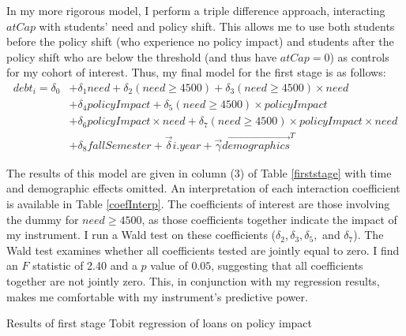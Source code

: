 \documentclass[12pt]{article}
\newcommand{\regs}{../Analysis/Regressions/Output/}
\begin{document}
	In my more rigorous model, I perform a triple difference approach, interacting $atCap$ with students' need and policy shift. This allows me to use both students before the policy shift (who experience no policy impact) and students after the policy shift who are below the threshold (and thus have $atCap = 0$) as controls for my cohort of interest. Thus, my final model for the first stage is as follows: 
	\begin{equation}
	\begin{aligned}
	debt_i = \delta_0 &+ \delta_1 need + \delta_2 (need \geq 4500) + \delta_3 (need \geq 4500) \times need \\ 
	&+ \delta_4 policyImpact + \delta_5 (need \geq 4500) \times policyImpact \\
	&+ \delta_6 policyImpact \times need + \delta_7 (need \geq 4500) \times policyImpact \times need \\
	&+ \delta_8 fallSemester + \vec{\delta} i.year + \vec{\gamma} \vec{demographics}^T
	 \end{aligned}
	 \end{equation} 
	 
	 The results of this model are given in column (3) of Table \ref{firststage} with time and demographic effects omitted. An interpretation of each interaction coefficient is available in Table \ref{coefInterp}. The coefficients of interest are those involving the dummy for $need \geq 4500$, as those coefficients together indicate the impact of my instrument. I run a Wald test on these coefficients ($\delta_2, \delta_3, \delta_5,$ and $\delta_7$). The Wald test examines whether all coefficients tested are jointly equal to zero. I find an $F$ statistic of 2.40 and a $p$ value of $0.05$, suggesting that all coefficients together are not jointly zero. This, in conjunction with my regression results, makes me comfortable with my instrument's predictive power.
	 
	 \begin{table}
	 	\centering
	 	\caption{Results of first stage Tobit regression of loans on policy impact}	 
	 	\resizebox{\textwidth}{!}{	
		 	
		 }
	 	\label{firststage}
	 \end{table}
	
\end{document}

